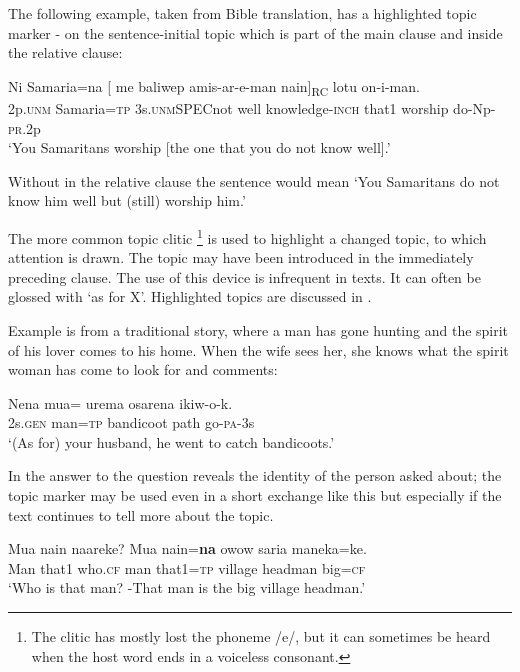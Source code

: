 The following example, taken from Bible translation, has a highlighted topic marker - on the sentence-initial topic  which is part of the main clause\textstyleAcronymallcaps{,} and  inside the relative clause:

\ea%
\label{ex:3:x1816}
\gll Ni Samaria=na [  me baliwep amis-ar-e-man nain]\textsubscript{RC} lotu on-i-man.\\
2p.\textsc{unm} Samaria=\textsc{tp} 3s.\textsc{unm}\textsc{SPEC}not well knowledge-\textsc{inch} that1 worship do-Np-\textsc{pr}.2p\\
\glt`You Samaritans worship [the one that you do not know well].'
\z

Without  in the relative clause the sentence would mean `You Samaritans do not know him well but (still) worship him.'

The more common topic clitic \footnote{The clitic has mostly lost the phoneme /e/, but it can sometimes be heard when the host word ends in a voiceless consonant. } is used to highlight a changed topic, to which attention is drawn. The topic may have been introduced in the immediately preceding clause. The use of this device is infrequent in texts. It can often be glossed with `as for X'. Highlighted topics are discussed in .

Example  is from a traditional story, where a man has gone hunting and the spirit of his lover comes to his home. When the wife sees her, she knows what the spirit woman has come to look for and comments:

\ea%
\label{ex:3:x779}
\gll Nena mua= urema osarena ikiw-o-k. \\
2s.\textsc{gen} man=\textsc{tp} bandicoot path go-\textsc{pa}-3s\\
\glt`(As for) your husband, he went to catch bandicoots.'
\z

In  the answer to the question reveals the identity of the person asked about; the topic marker may be used even in a short exchange like this but especially if the text continues to tell more about the topic. 

\ea%
\label{ex:3:x1751}
\gll Mua nain naareke? Mua nain=\textbf{na} owow saria maneka=ke. \\
Man that1 who.\textsc{cf} man that1=\textsc{tp} village headman big=\textsc{cf}\\
\glt`Who is that man? -That man is the big village headman.'
\z

